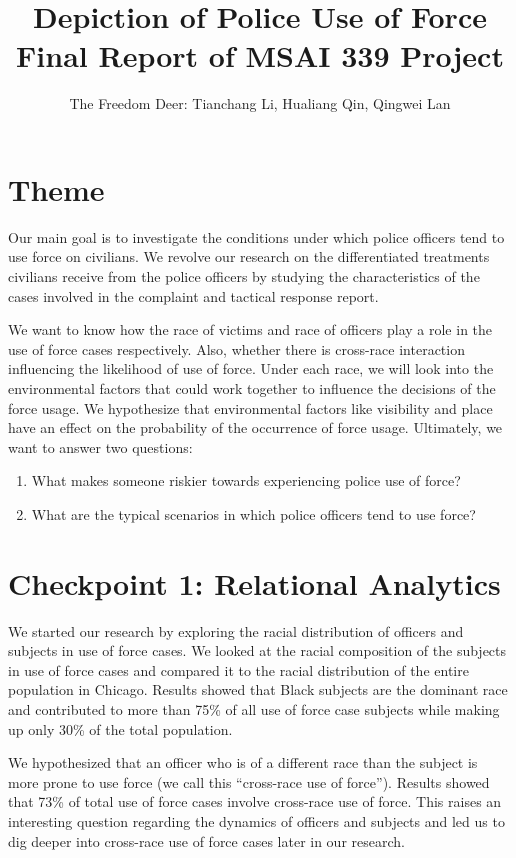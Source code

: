 \documentclass[10pt]{article}
\title{%
    Depiction of Police Use of Force\\
    \normalsize Final Report of MSAI 339 Project
}
\author{The Freedom Deer: Tianchang Li, Hualiang Qin, Qingwei Lan}
\begin{document}
\maketitle



\section*{Theme}

Our main goal is to investigate the conditions under which police officers tend to use force on civilians. We revolve our research on the differentiated treatments civilians receive from the police officers by studying the characteristics of the cases involved in the complaint and tactical response report. 

We want to know how the race of victims and race of officers play a role in the use of force cases respectively. Also, whether there is cross-race interaction influencing the likelihood of use of force. Under each race, we will look into the environmental factors that could work together to influence the decisions of the force usage. We hypothesize that environmental factors like visibility and place have an effect on the probability of the occurrence of force usage. Ultimately, we want to answer two questions:

\begin{enumerate}[noitemsep]
\item What makes someone riskier towards experiencing police use of force?
\item What are the typical scenarios in which police officers tend to use force?
\end{enumerate}



\section*{Checkpoint 1: Relational Analytics}

We started our research by exploring the racial distribution of officers and subjects in use of force cases. We looked at the racial composition of the subjects in use of force cases and compared it to the racial distribution of the entire population in Chicago. Results showed that Black subjects are the dominant race and contributed to more than 75\% of all use of force case subjects while making up only 30\% of the total population.

We hypothesized that an officer who is of a different race than the subject is more prone to use force (we call this “cross-race use of force”). Results showed that 73\% of total use of force cases involve cross-race use of force. This raises an interesting question regarding the dynamics of officers and subjects and led us to dig deeper into cross-race use of force cases later in our research.
\end{document}

